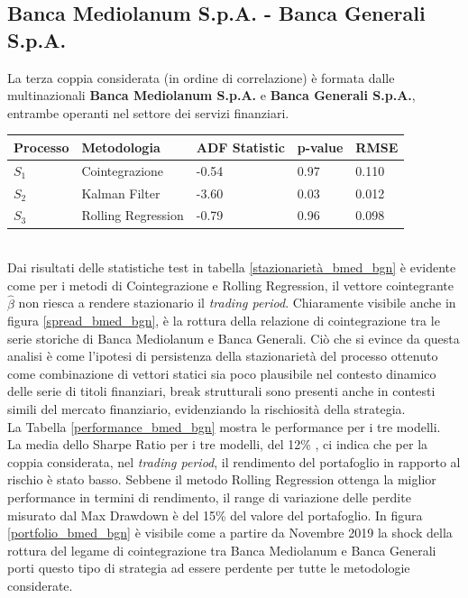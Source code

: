 \documentclass[]{article}
\begin{document}
\break

\subsection*{ Banca Mediolanum S.p.A. - Banca Generali S.p.A.}

La terza coppia considerata (in ordine di correlazione) è formata dalle multinazionali \textbf{Banca Mediolanum S.p.A.} e  \textbf{Banca Generali S.p.A.}, entrambe operanti nel settore dei servizi finanziari.

\begin{center}
	\label{stazionarietà_bmed_bgn}
	\begin{tabular}{ p{2cm}p{3cm}p{1cm}p{2cm}p{1cm}}
		\hline
		Processo & Metodologia & ADF Statistic & p-value & RMSE \\
		\hline
		$S_1$ & Cointegrazione & -0.54 &  0.97 & 0.110  \\
		$S_2$ & Kalman Filter & -3.60 &  0.03 &  0.012 \\
		$S_3$ & Rolling Regression & -0.79 & 0.96 & 0.098 \\
		\hline
	\end{tabular}
\end{center}
\
\\
Dai risultati delle statistiche test in tabella \ref{stazionarietà_bmed_bgn} è evidente come per i metodi di Cointegrazione e Rolling Regression, il vettore cointegrante $\hat{\beta}$ non riesca a rendere stazionario il \textit{trading period}.
Chiaramente visibile anche in figura \ref{spread_bmed_bgn}, è la rottura della relazione di cointegrazione tra le serie storiche di Banca Mediolanum e Banca Generali.
Ciò che si evince da questa analisi è come l'ipotesi di persistenza della stazionarietà del processo ottenuto come combinazione di vettori statici sia poco plausibile nel contesto dinamico delle serie di titoli finanziari, break strutturali sono presenti anche in contesti simili del mercato finanziario, evidenziando la rischiosità della strategia.
\\
La Tabella \ref{performance_bmed_bgn} mostra le performance per i tre modelli.
\\
La media dello Sharpe Ratio per i tre modelli, del 12\% , ci indica che per la coppia considerata, nel \textit{trading period}, il rendimento del portafoglio in rapporto al rischio è stato basso.
Sebbene il metodo Rolling Regression ottenga la miglior performance in termini di rendimento, il range di variazione delle perdite misurato dal Max Drawdown è del 15\% del valore del portafoglio.
In figura \ref{portfolio_bmed_bgn} è visibile come a partire da Novembre 2019 la shock della rottura del legame di cointegrazione tra Banca Mediolanum e Banca Generali porti questo tipo di strategia ad essere perdente per tutte le metodologie considerate.
\end{document}
